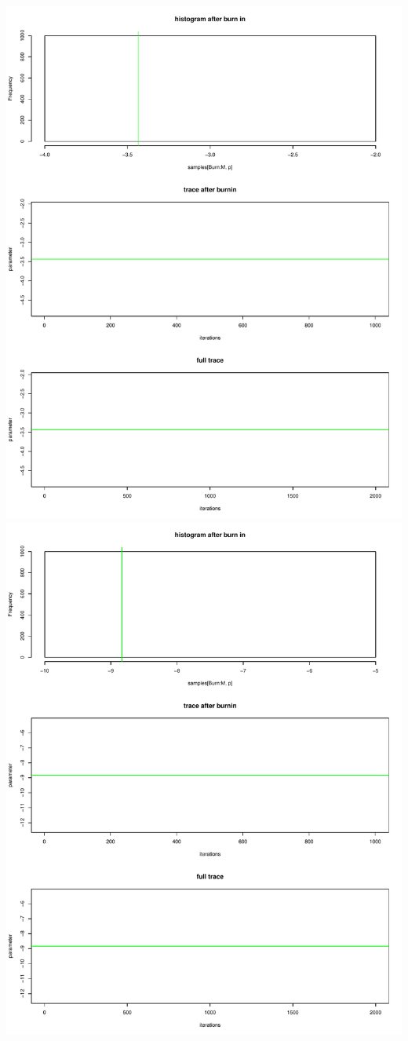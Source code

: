 \documentclass[a4paper,12pt]{scrartcl} %
\begin{document}
\includegraphics[scale=0.4]{11}
\includegraphics[scale=0.4]{12}
\end{document}

